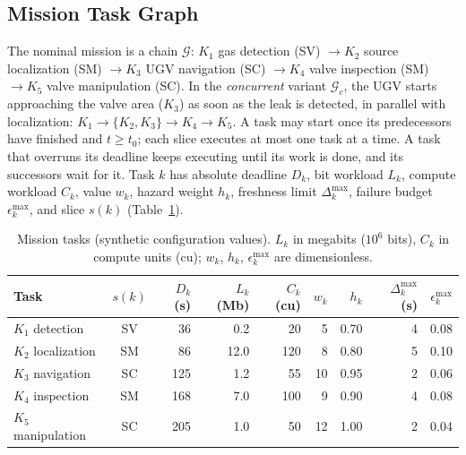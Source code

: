 \documentclass[conference]{IEEEtran}
\begin{document}
\subsection{Mission Task Graph}
The nominal mission is a chain $\mathcal{G}$: $K_1$ gas detection (SV) $\to K_2$ source localization (SM) $\to K_3$ UGV navigation (SC) $\to K_4$ valve inspection (SM) $\to K_5$ valve manipulation (SC). In the \emph{concurrent} variant $\mathcal{G}_c$, the UGV starts approaching the valve area ($K_3$) as soon as the leak is detected, in parallel with localization: $K_1\to\{K_2,K_3\}\to K_4\to K_5$. A task may start once its predecessors have finished and $t\ge t_0$; each slice executes at most one task at a time. A task that overruns its deadline keeps executing until its work is done, and its successors wait for it. Task $k$ has absolute deadline $D_k$, bit workload $L_k$, compute workload $C_k$, value $w_k$, hazard weight $h_k$, freshness limit $\Delta_k^{\max}$, failure budget $\epsilon_k^{\max}$, and slice $s(k)$ (Table~\ref{tab:tasks}).

\begin{table}[t]
\centering
\caption{Mission tasks (synthetic configuration values). $L_k$ in megabits ($10^6$ bits), $C_k$ in compute units (cu); $w_k$, $h_k$, $\epsilon_k^{\max}$ are dimensionless.}
\label{tab:tasks}
\scriptsize
\setlength{\tabcolsep}{2.6pt}
\begin{tabular}{lcrrrrrrr}
\toprule
Task & $s(k)$ & $D_k$ (s) & $L_k$ (Mb) & $C_k$ (cu) & $w_k$ & $h_k$ & $\Delta_k^{\max}$ (s) & $\epsilon_k^{\max}$\\
\midrule
$K_1$ detection & SV & 36 & 0.2 & 20 & 5 & 0.70 & 4 & 0.08\\
$K_2$ localization & SM & 86 & 12.0 & 120 & 8 & 0.80 & 5 & 0.10\\
$K_3$ navigation & SC & 125 & 1.2 & 55 & 10 & 0.95 & 2 & 0.06\\
$K_4$ inspection & SM & 168 & 7.0 & 100 & 9 & 0.90 & 4 & 0.08\\
$K_5$ manipulation & SC & 205 & 1.0 & 50 & 12 & 1.00 & 2 & 0.04\\
\bottomrule
\end{tabular}
\end{table}
\end{document}
